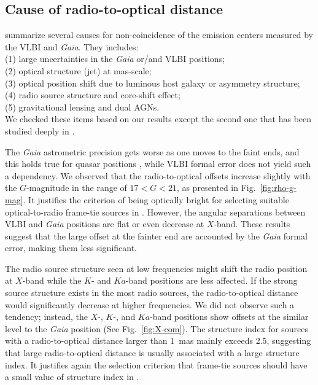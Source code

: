 \documentclass{aa-note}   %
\begin{document}
\subsection{Cause of radio-to-optical distance} \label{subsec:cause-of-VG}
%
\citet{2017MNRAS.471.3775P} summarize several causes for non-coincidence of the emission centers measured by the VLBI and \textit{Gaia}.
They includes:\\
(1) large uncertainties in the \textit{Gaia} or/and VLBI positions;\\
(2) optical structure (jet) at mas-scale; \\
(3) optical position shift due to luminous host galaxy or asymmetry structure;\\
(4) radio source structure and core-shift effect;\\
(5) gravitational lensing and dual AGNs.\\
We checked these items based on our results except the second one that has been studied deeply in \citet{2017A&A...598L...1K,2017MNRAS.467L..71P,2017MNRAS.471.3775P,2019MNRAS.482.3023P,2019ApJ...871..143P,2020MNRAS.493L..54K}. %

The \textit{Gaia} astrometric precision gets worse as one moves to the faint ends, and this holds true for quasar positions \citep{2016A&A...595A...5M,2018A&A...616A..14G}, while VLBI formal error does not yield such a dependency.
We observed that the radio-to-optical offsets increase slightly with the $G$-magnitude in the range of $17<G<21$, as presented in Fig.~\ref{fig:rho-g-mag}.
It justifies the criterion of being optically bright for selecting suitable optical-to-radio frame-tie sources in \citet{2008A&A...490..403B}.
However, the angular separations between VLBI and \textit{Gaia} positions are flat or even decrease at $X$-band.
These results suggest that the large offset at the fainter end are accounted by the \textit{Gaia} formal error, making them less significant.

The radio source structure seen at low frequencies might shift the radio position at $X$-band while the $K$- and $Ka$-band positions are less affected.
If the strong source structure exists in the most radio sources, the radio-to-optical distance would significantly decrease at higher frequencies.
We did not observe such a tendency; 
instead, the $X$-, $K$-, and $Ka$-band positions show offsets at the similar level to the \textit{Gaia} position (See Fig.~\ref{fig:X-com}).
The structure index for sources with a radio-to-optical distance larger than 1~mas mainly exceeds 2.5, suggesting that large radio-to-optical distance is usually associated with a large structure index.
It justifies again the selection criterion that frame-tie sources should have a small value of structure index in \citet{2008A&A...490..403B}.
\end{document}
